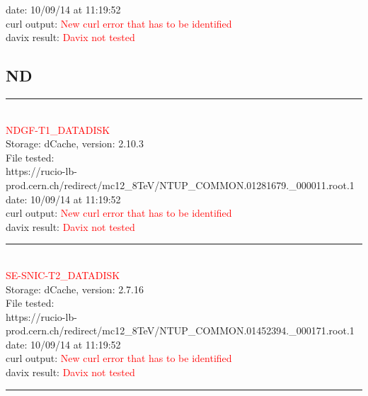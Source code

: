 date: 10/09/14 at 11:19:52\\

curl output:  \textcolor{red}{New curl error that has to be identified}\\

davix result:  \textcolor{red}{Davix not tested}\\

\subsection{ND}

\rule{\textwidth}{1pt}\\

\textcolor{red}{\normalsize{NDGF-T1\_DATADISK}}\\

Storage: dCache, version: 2.10.3\\

File tested:\\
\footnotesize{https://rucio-lb-prod.cern.ch/redirect/mc12\_8TeV/NTUP\_COMMON.01281679.\_000011.root.1}\\

date: 10/09/14 at 11:19:52\\

curl output:  \textcolor{red}{New curl error that has to be identified}\\

davix result:  \textcolor{red}{Davix not tested}\\

\rule{\textwidth}{1pt}\\

\textcolor{red}{\normalsize{SE-SNIC-T2\_DATADISK}}\\

Storage: dCache, version: 2.7.16\\

File tested:\\
\footnotesize{https://rucio-lb-prod.cern.ch/redirect/mc12\_8TeV/NTUP\_COMMON.01452394.\_000171.root.1}\\

date: 10/09/14 at 11:19:52\\

curl output:  \textcolor{red}{New curl error that has to be identified}\\

davix result:  \textcolor{red}{Davix not tested}\\

\rule{\textwidth}{1pt}\\

